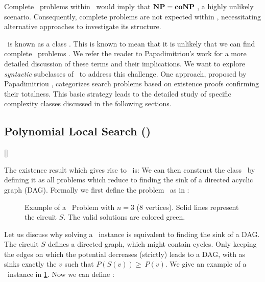 Complete \FNP\ problems within \TFNP\ would imply that $\textbf{NP} = \textbf{coNP}$ , a highly unlikely scenario. Consequently, complete problems are not expected within \TFNP, necessitating alternative approaches to investigate its structure.

\TFNP\ is known as a  class . This is known to mean that it is unlikely that we can find complete \TFNP\ problems . We refer the reader to Papadimitriou's work  for a more detailed discussion of these terms and their implications. We want to explore \textit{syntactic} subclasses of \TFNP\ to address this challenge. One approach, proposed by Papadimitriou \cite{papadimitriou_computational_1994}, categorizes search problems based on existence proofs confirming their totalness. This basic strategy leads to the detailed study of specific complexity classes discussed in the following sections.

\subsection{Polynomial Local Search (\PLS)}[\PLS]

The existence result which gives rise to \PLS\ is:
We can then construct the class \PLS\ by defining it as all problems which reduce to finding the sink of a directed acyclic graph (DAG). Formally we first define the problem \Localopt\ as in :


\begin{figure}
	\centering
	\caption[Example of a \Localopt\ Problem]{Example of a \Localopt\ Problem with $n=3$ (8 vertices). Solid lines represent the circuit $S$. The valid solutions are colored green.}
	\label{fig:localopt_example}
\end{figure}

Let us discuss why solving a \Localopt\ instance is equivalent to finding the sink of a DAG. The circuit $S$ defines a directed graph, which might contain cycles. Only keeping the edges on which the potential decreases (strictly) leads to a DAG, with as sinks exactly the $v$ such that $P(S(v)) \geq\ P(v)$. We give an example of a \Localopt\ instance in \cref{fig:localopt_example}. Now we can define \PLS:

